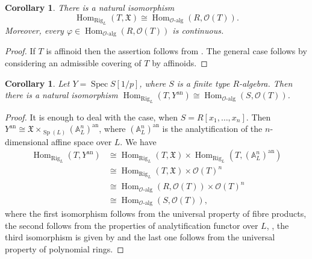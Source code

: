 \documentclass{amsart}
\newtheorem{cor}[prop]{Corollary}
\theoremstyle{definition}
\theoremstyle{remark}
\DeclareMathOperator{\Hom}{Hom}
\DeclareMathOperator{\Spec}{Spec}
\DeclareMathOperator{\Sp}{Sp}
\newcommand{\OO}{\mathcal O}
\newcommand{\ana}{\mathrm{an}}
\newcommand{\alg}{\mathrm{alg}}
\newcommand{\Rig}{\mathrm{Rig}}
\begin{document}
\begin{cor}\label{bsch} There is a natural isomorphism
$$\Hom_{\Rig_L}(T, \mathfrak X)\cong \Hom_{\OO\text{-}\alg}(R, \OO(T)).$$
Moreover, every $\varphi\in \Hom_{\OO\text{-}\alg}(R, \OO(T))$ is continuous.
\end{cor} 
\begin{proof} If $T$ is affinoid then the assertion follows from 
. The general case follows by considering an admissible 
covering of $T$ by affinoids. 
\end{proof} 


\begin{cor}\label{bsch_aff} Let $Y=\Spec S[1/p]$, where  $S$ is a finite type $R$-algebra. Then there is a natural isomorphism $\Hom_{\Rig_L}(T, Y^{\ana})\cong \Hom_{\OO\text{-}\alg}(S, \OO(T))$.
\end{cor}
\begin{proof} It is enough to deal with the case, when $S=R[x_1, \ldots, x_n]$.
Then $Y^{\ana}\cong \mathfrak X\times_{\Sp(L)} (\mathbb A^n_L)^{\ana}$, where $(\mathbb A^n_L)^{\ana}$ is the analytification of the $n$-dimensional affine space over $L$. We have
\begin{equation}
\begin{split}
\Hom_{\Rig_L}(T, Y^{\ana})&\cong \Hom_{\Rig_L}(T, \mathfrak X)\times \Hom_{\Rig_L}(T, (\mathbb A^n_L)^{\ana})\\
&\cong \Hom_{\Rig_L}(T, \mathfrak X)\times \OO(T)^n\\
&\cong\Hom_{\OO\text{-}\alg}(R, \OO(T))\times \OO(T)^n\\
& \cong\Hom_{\OO\text{-}\alg}(S, \OO(T)),
\end{split}
\end{equation}
where the first isomorphism follows from the universal property of fibre products, the second follows from the properties of analytification functor over $L$, \cite[Lemma 5.4/2]{bosch}, the 
third isomorphism is given by  and the 
last one follows from the universal property of polynomial rings. 
\end{proof} 
\end{document}
